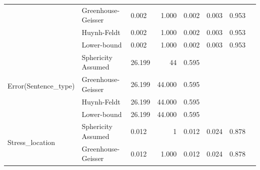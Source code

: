\documentclass[a4paper]{article}
\begin{document}
\begin{table}[H]
\begin{center}
\begin{tabular}{p{}p{}|l|r|r|r|r|r|}
\cline{2-7}
                                                        & Greenhouse-Geisser & 0.002                                        & 1.000                   & 0.002                            & 0.003                  & 0.953                      \\ 
\cline{2-7}
                                                        & Huynh-Feldt        & 0.002                                        & 1.000                   & 0.002                            & 0.003                  & 0.953                      \\ 
\cline{2-7}
                                                        & Lower-bound        & 0.002                                        & 1.000                   & 0.002                            & 0.003                  & 0.953                      \\ 
\hline
\multirow{4}{*}{Error(Sentence\_type)}                  & Sphericity Assumed & 26.199                                       & 44                      & 0.595                            & \multicolumn{1}{l|}{~} & \multicolumn{1}{l|}{~}     \\ 
\cline{2-7}
                                                        & Greenhouse-Geisser & 26.199                                       & 44.000                  & 0.595                            & \multicolumn{1}{l|}{~} & \multicolumn{1}{l|}{~}     \\ 
\cline{2-7}
                                                        & Huynh-Feldt        & 26.199                                       & 44.000                  & 0.595                            & \multicolumn{1}{l|}{~} & \multicolumn{1}{l|}{~}     \\ 
\cline{2-7}
                                                        & Lower-bound        & 26.199                                       & 44.000                  & 0.595                            & \multicolumn{1}{l|}{~} & \multicolumn{1}{l|}{~}     \\ 
\hline
\multirow{4}{*}{Stress\_location}                       & Sphericity Assumed & 0.012                                        & 1                       & 0.012                            & 0.024                  & 0.878                      \\ 
\cline{2-7}
                                                        & Greenhouse-Geisser & 0.012                                        & 1.000                   & 0.012                            & 0.024                  & 0.878                      \\ 

\end{tabular}
\end{center}
\end{table}
\end{document}
